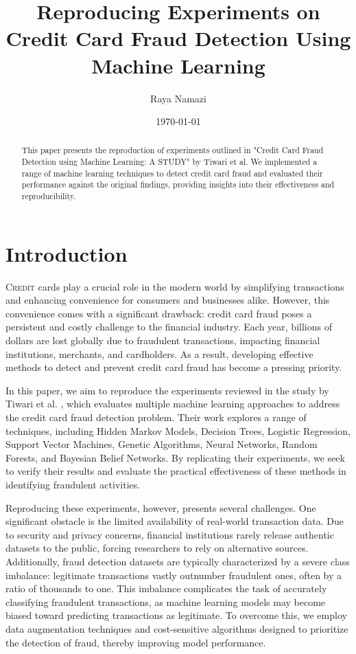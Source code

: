 \documentclass{article}
\title{Reproducing Experiments on Credit Card Fraud Detection Using Machine Learning}
\author{Raya Namazi}
\date{\today}
\begin{document}
\maketitle

\begin{abstract}
This paper presents the reproduction of experiments outlined in "Credit Card Fraud Detection using Machine Learning: A STUDY" by Tiwari et al\cite{tiwari2021credit}. We implemented a range of machine learning techniques to detect credit card fraud and evaluated their performance against the original findings, providing insights into their effectiveness and reproducibility.
\end{abstract}

\section{Introduction}
\lettrine{C}{redit} cards play a crucial role in the modern world by simplifying transactions and enhancing convenience for consumers and businesses alike. However, this convenience comes with a significant drawback: credit card fraud poses a persistent and costly challenge to the financial industry. Each year, billions of dollars are lost globally due to fraudulent transactions, impacting financial institutions, merchants, and cardholders. As a result, developing effective methods to detect and prevent credit card fraud has become a pressing priority.

In this paper, we aim to reproduce the experiments reviewed in the study by Tiwari et al. \cite{tiwari2021credit}, which evaluates multiple machine learning approaches to address the credit card fraud detection problem. Their work explores a range of techniques, including Hidden Markov Models, Decision Trees, Logistic Regression, Support Vector Machines, Genetic Algorithms, Neural Networks, Random Forests, and Bayesian Belief Networks. By replicating their experiments, we seek to verify their results and evaluate the practical effectiveness of these methods in identifying fraudulent activities.

Reproducing these experiments, however, presents several challenges. One significant obstacle is the limited availability of real-world transaction data. Due to security and privacy concerns, financial institutions rarely release authentic datasets to the public, forcing researchers to rely on alternative sources. Additionally, fraud detection datasets are typically characterized by a severe class imbalance: legitimate transactions vastly outnumber fraudulent ones, often by a ratio of thousands to one. This imbalance complicates the task of accurately classifying fraudulent transactions, as machine learning models may become biased toward predicting transactions as legitimate. To overcome this, we employ data augmentation techniques and cost-sensitive algorithms designed to prioritize the detection of fraud, thereby improving model performance.
\end{document}
